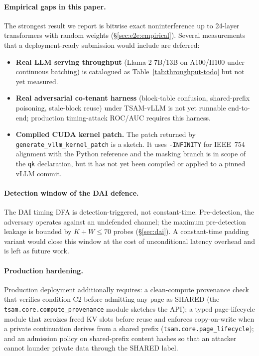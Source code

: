 \documentclass[11pt]{article}
\begin{document}
\paragraph{Empirical gaps in this paper.}
The strongest result we report is bitwise exact noninterference up to
24-layer transformers with random weights
(\S\ref{sec:e2e:empirical}).  Several measurements that a
deployment-ready submission would include are deferred:
\begin{itemize}[leftmargin=1.5em,itemsep=2pt]
\item \textbf{Real LLM serving throughput} (Llama-2-7B/13B on A100/H100
  under continuous batching) is catalogued as
  Table~\ref{tab:throughput-todo} but not yet measured.
\item \textbf{Real adversarial co-tenant harness} (block-table confusion,
  shared-prefix poisoning, stale-block reuse) under TSAM-vLLM is not
  yet runnable end-to-end; production timing-attack ROC/AUC requires
  this harness.
\item \textbf{Compiled CUDA kernel patch.}  The patch returned by
  \texttt{generate\_vllm\_kernel\_patch} is a sketch.  It uses
  \texttt{-INFINITY} for IEEE~754 alignment with the Python reference
  and the masking branch is in scope of the \texttt{qk} declaration, but
  it has not yet been compiled or applied to a pinned vLLM commit.
\end{itemize}

\paragraph{Detection window of the DAI defence.}
The DAI timing DFA is detection-triggered, not constant-time.  Pre-detection,
the adversary operates against an undefended channel; the maximum
pre-detection leakage is bounded by $K + W \leq 70$ probes (\S\ref{sec:dai}).
A constant-time padding variant would close this window at the cost of
unconditional latency overhead and is left as future work.

\paragraph{Production hardening.}  Production deployment additionally
requires: a clean-compute provenance check that verifies condition C2
before admitting any page as SHARED (the
\texttt{tsam.core.compute\_provenance} module sketches the API); a typed
page-lifecycle module that zeroizes freed KV slots before reuse and
enforces copy-on-write when a private continuation derives from a shared
prefix (\texttt{tsam.core.page\_lifecycle}); and an admission policy on
shared-prefix content hashes so that an attacker cannot launder private
data through the SHARED label.
\end{document}
